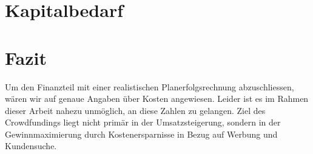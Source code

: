 \section{Kapitalbedarf}
\section{Fazit}
Um den Finanzteil mit einer realistischen Planerfolgsrechnung abzuschliessen, w\"aren wir auf genaue Angaben \"uber Kosten angewiesen. Leider ist es im Rahmen dieser Arbeit nahezu unm\"oglich, an diese Zahlen zu gelangen. Ziel des Crowdfundings liegt nicht prim\"ar in der Umsatzsteigerung, sondern in der Gewinnmaximierung durch Kostenersparnisse in Bezug auf Werbung und Kundensuche. 